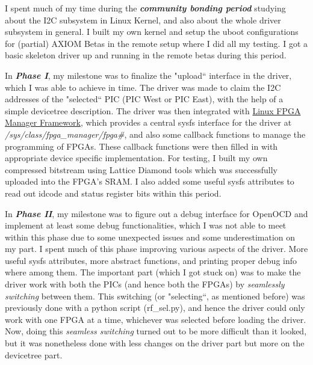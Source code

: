 \documentclass{article}
\begin{document}
I spent much of my time during the \emph{\textbf{community bonding period}} studying about the
I2C subsystem in Linux Kernel, and also about the whole driver subsystem in general.
I built my own kernel and setup the uboot configurations for (partial) AXIOM Betas
in the remote setup where I did all my testing. I got a basic skeleton driver
up and running in the remote betas during this period.\newline

In \emph{\textbf{Phase I}}, my milestone was to finalize the "upload`` interface in the
driver, which I was able to achieve in time. The driver was made to claim the
I2C addresses
of the "selected`` PIC (PIC West or PIC East), with the help
of a simple devicetree description. The driver was
then integrated with
\href{https://www.kernel.org/doc/html/v4.18/driver-api/fpga/fpga-mgr.html}{Linux FPGA Manager Framework},
which provides a central
sysfs interface for the driver at \emph{/sys/class/fpga\_manager/fpga\#}, and also
some callback functions to manage the programming of FPGAs. These callback
functions were then filled in with appropriate device specific implementation.
For testing, I built my own compressed bitstream using Lattice Diamond tools which
was successfully uploaded into the FPGA's SRAM. I also added some useful sysfs
attributes to read out idcode and status register bits within this period.\newline

In \emph{\textbf{Phase II}}, my milestone was to figure out a debug interface for OpenOCD
and implement at least some debug functionalities, which I was not able to meet
within this phase due to some unexpected issues and some underestimation on my part.
I spent much of this phase improving various aspects of the driver. More
useful sysfs attributes, more abstract functions, and printing proper debug
info where among them.
The important part (which I got stuck on) was to make the driver work with
both the PICs (and hence both the FPGAs) by \emph{seamlessly switching} between them.
This switching (or "selecting``, as mentioned before) was previously done with
a python script (rf\_sel.py), and hence the driver could only work with one FPGA
at a time, whichever was selected before loading the driver.
Now, doing this \emph{seamless switching} turned out to be more difficult than it looked,
but it was
nonetheless done with less changes on the driver part but more on the
devicetree part.\newline
\end{document}
